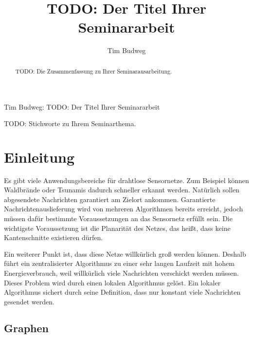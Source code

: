 \documentclass[a4paper,twoside]{IEEEtran}
\newcommand{\seminarteilnehmer}{Tim Budweg}
\newcommand{\seminartitel}{TODO: Der Titel Ihrer Seminararbeit}
\begin{document}
\title{\seminartitel}
\author{\seminarteilnehmer}

%
{\seminarteilnehmer: \seminartitel}


\maketitle

\begin{abstract}
TODO: Die Zusammenfassung zu Ihrer Seminarausarbeitung.
\end{abstract}

\begin{IEEEkeywords}
TODO: Stichworte zu Ihrem Seminarthema.
\end{IEEEkeywords}


\section{Einleitung}
Es gibt viele Anwendungsbereiche für drahtlose Sensornetze. 
Zum Beispiel können Waldbrände oder Tsunamis dadurch schneller erkannt werden. 
Natürlich sollen abgesendete Nachrichten garantiert am Zielort ankommen. 
Garantierte Nachrichtenauslieferung wird von mehreren Algorithmen bereits erreicht, jedoch müssen dafür bestimmte Voraussetzungen an das Sensornetz erfüllt sein. 
Die wichtigste Voraussetzung ist die Planarität des Netzes, das heißt, dass keine Kantenschnitte existieren dürfen.

Ein weiterer Punkt ist, dass diese Netze willkürlich groß werden können.
Deshalb führt ein zentralisierter Algorithmus zu einer sehr langen Laufzeit mit hohem Energieverbrauch, weil willkürlich viele Nachrichten verschickt werden müssen. 
Dieses Problem wird durch einen lokalen Algorithmus gelöst. 
Ein lokaler Algorithmus sichert durch seine Definition, dass nur konstant viele Nachrichten gesendet werden. %




\subsection{Graphen}
\end{document}
